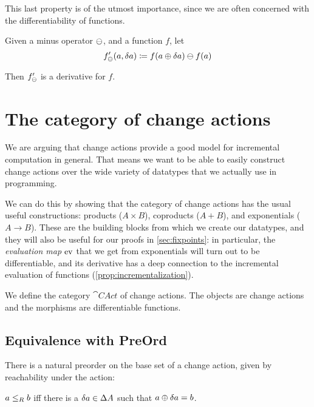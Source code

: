 This last property is of the utmost importance, since we are often concerned with the differentiability
of functions.

\begin{prop}
  Given a minus operator $\ominus$, and a function $f$, let
  \begin{displaymath}
    f'_\ominus(a, \delta a) \coloneqq f(a \oplus \delta a) \ominus f(a)
  \end{displaymath}

  Then $f'_\ominus$ is a derivative for $f$.
\end{prop}

\section{The category of change actions}
\label{sec:category}

We are arguing that change actions provide a good model for incremental
computation in general. That means we want to be able to easily construct change
actions over the wide variety of datatypes that we actually use in programming.

We can do this by showing that the category of change actions has the usual
useful constructions: products ($A \times B$), coproducts ($A + B$), and
exponentials ($A \rightarrow B$). These are the
building blocks from which we create our datatypes, and they will also be useful
for our proofs in \cref{sec:fixpoints}: in particular, the \emph{evaluation map}
$\operatorname{ev}$ that we get from exponentials will turn out to be differentiable, and its
derivative has a deep connection to the incremental evaluation of functions (\cref{prop:incrementalization}).

\begin{defn}
  We define the category $\cat{CAct}$ of change actions. The objects are
  change actions and the morphisms are differentiable functions. 
\end{defn}

\subsection{Equivalence with PreOrd}

There is a natural preorder on the base set of a change action, given by reachability
under the action:

\begin{defn}
  $a \leq_R b$ iff there is a $\delta a \in \Delta A$ such that $a \oplus
  \delta a = b$.
\end{defn}

